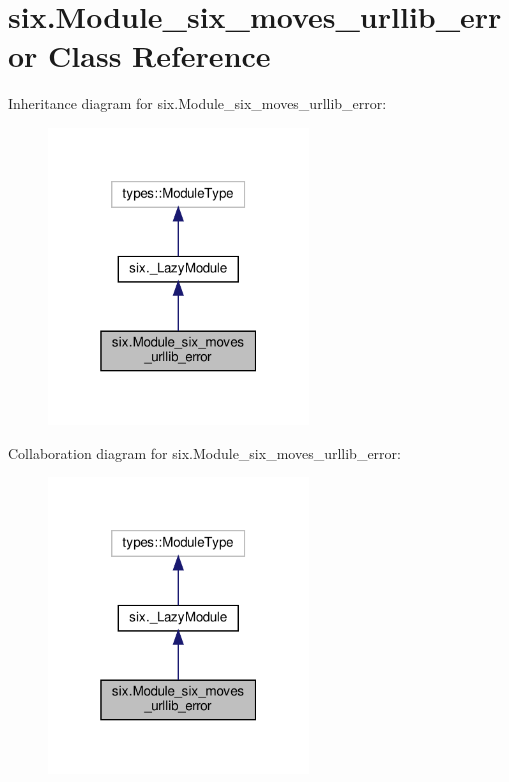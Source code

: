 \hypertarget{classsix_1_1Module__six__moves__urllib__error}{}\section{six.\+Module\+\_\+six\+\_\+moves\+\_\+urllib\+\_\+error Class Reference}
\label{classsix_1_1Module__six__moves__urllib__error}


Inheritance diagram for six.\+Module\+\_\+six\+\_\+moves\+\_\+urllib\+\_\+error\+:
\nopagebreak
\begin{figure}[H]
\begin{center}
\leavevmode
\includegraphics[width=196pt]{classsix_1_1Module__six__moves__urllib__error__inherit__graph}
\end{center}
\end{figure}


Collaboration diagram for six.\+Module\+\_\+six\+\_\+moves\+\_\+urllib\+\_\+error\+:
\nopagebreak
\begin{figure}[H]
\begin{center}
\leavevmode
\includegraphics[width=196pt]{classsix_1_1Module__six__moves__urllib__error__coll__graph}
\end{center}
\end{figure}
